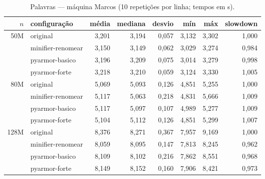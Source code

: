 \begin{table}[ht]\centering\footnotesize
\caption{Palavras --- máquina Marcos (10 repetições por linha; tempos em s).}\label{tab:marcos-palavras}
\begin{tabular}{rlrrrrrr}\hline
$n$ & configuração & média & mediana & desvio & mín & máx & slowdown \\\hline
50M & original & 3,201 & 3,194 & 0,057 & 3,132 & 3,302 & 1,000 \\
 & minifier-renomear & 3,150 & 3,149 & 0,062 & 3,029 & 3,274 & 0,984 \\
 & pyarmor-basico & 3,196 & 3,209 & 0,075 & 3,014 & 3,279 & 0,998 \\
 & pyarmor-forte & 3,218 & 3,210 & 0,059 & 3,124 & 3,330 & 1,005 \\
\hline
80M & original & 5,069 & 5,093 & 0,126 & 4,851 & 5,255 & 1,000 \\
 & minifier-renomear & 5,117 & 5,063 & 0,218 & 4,831 & 5,666 & 1,009 \\
 & pyarmor-basico & 5,117 & 5,097 & 0,107 & 4,989 & 5,277 & 1,009 \\
 & pyarmor-forte & 5,104 & 5,112 & 0,126 & 4,851 & 5,299 & 1,007 \\
\hline
128M & original & 8,376 & 8,271 & 0,367 & 7,957 & 9,169 & 1,000 \\
 & minifier-renomear & 8,059 & 8,095 & 0,147 & 7,813 & 8,245 & 0,962 \\
 & pyarmor-basico & 8,109 & 8,102 & 0,216 & 7,862 & 8,551 & 0,968 \\
 & pyarmor-forte & 8,149 & 8,152 & 0,160 & 7,906 & 8,421 & 0,973 \\
\hline
\end{tabular}\end{table}

